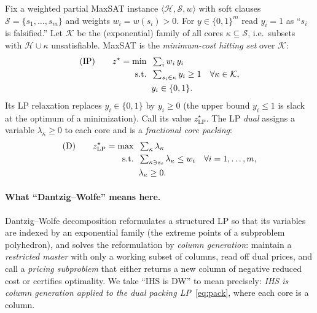Fix a weighted partial MaxSAT instance $\langle \mathcal{H}, \mathcal{S}, w
\rangle$ with soft clauses $\mathcal{S} = \{s_1,\dots,s_m\}$ and weights
$w_i = w(s_i) > 0$. For $y \in \{0,1\}^m$ read $y_i = 1$ as ``$s_i$ is
falsified.'' Let $\mathcal{K}$ be the (exponential) family of all cores
$\kappa \subseteq \mathcal{S}$, i.e.\ subsets with $\mathcal{H} \cup \kappa$
unsatisfiable. MaxSAT is the \emph{minimum-cost hitting set} over $\mathcal{K}$:
\begin{align}
(\mathrm{IP})\qquad
z^\star = \min \;\; & \textstyle\sum_{i} w_i\, y_i \notag\\
\text{s.t.} \;\; & \textstyle\sum_{s_i \in \kappa} y_i \ge 1 \quad \forall \kappa \in \mathcal{K}, \label{eq:hit}\\
& y_i \in \{0,1\}. \notag
\end{align}
Its LP relaxation replaces $y_i \in \{0,1\}$ by $y_i \ge 0$ (the upper bound
$y_i \le 1$ is slack at the optimum of a minimization). Call its value
$z^\star_{\mathrm{LP}}$. The LP \emph{dual} assigns a variable
$\lambda_\kappa \ge 0$ to each core and is a \emph{fractional core packing}:
\begin{align}
(\mathrm{D})\qquad
z^\star_{\mathrm{LP}} = \max \;\; & \textstyle\sum_{\kappa} \lambda_\kappa \notag\\
\text{s.t.} \;\; & \textstyle\sum_{\kappa \ni s_i} \lambda_\kappa \le w_i \quad \forall i = 1,\dots,m, \label{eq:pack}\\
& \lambda_\kappa \ge 0. \notag
\end{align}

\paragraph{What ``Dantzig--Wolfe'' means here.} Dantzig--Wolfe decomposition
reformulates a structured LP so that its variables are indexed by an exponential
family (the extreme points of a subproblem polyhedron), and solves the
reformulation by \emph{column generation}: maintain a \emph{restricted master}
with only a working subset of columns, read off dual prices, and call a
\emph{pricing subproblem} that either returns a new column of negative reduced
cost or certifies optimality. We take ``IHS is DW'' to mean precisely:
\emph{IHS is column generation applied to the dual packing LP}~\eqref{eq:pack},
where each core is a column.

